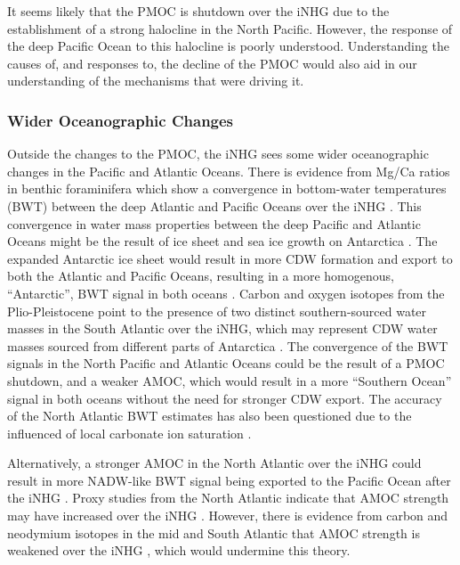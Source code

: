 It seems likely that the PMOC is shutdown over the iNHG due to the establishment of a strong halocline in the North Pacific. However, the response of the deep Pacific Ocean to this halocline is poorly understood. Understanding the causes of, and responses to, the decline of the PMOC would also aid in our understanding of the mechanisms that were driving it.

\subsubsection{Wider Oceanographic Changes}

Outside the changes to the PMOC, the iNHG sees some wider oceanographic changes in the Pacific and Atlantic Oceans. There is evidence from Mg/Ca ratios in benthic foraminifera which show a convergence in bottom-water temperatures (BWT) between the deep Atlantic and Pacific Oceans over the iNHG \citep{woodardAntarcticRoleNorthern2014}. This convergence in water mass properties between the deep Pacific and Atlantic Oceans might be the result of ice sheet and sea ice growth on Antarctica \citep{woodardAntarcticRoleNorthern2014}. The expanded Antarctic ice sheet would result in more CDW formation and export to both the Atlantic and Pacific Oceans, resulting in a more homogenous, ``Antarctic'', BWT signal in both oceans \citep{hillModelledOceanChanges2017}. Carbon and oxygen isotopes from the Plio-Pleistocene point to the presence of two distinct southern-sourced water masses in the South Atlantic over the iNHG, which may represent CDW water masses sourced from different parts of Antarctica \citep{vanderweijstTernaryMixingModel2020}. The convergence of the BWT signals in the North Pacific and Atlantic Oceans could be the result of a PMOC shutdown, and a weaker AMOC, which would result in a more “Southern Ocean” signal in both oceans without the need for stronger CDW export. The accuracy of the North Atlantic BWT estimates has also been questioned due to the influenced of local carbonate ion saturation \citep{yuCommentDeepSeaTemperature2010,sosdianResponseCommentDeepSea2010,sosdianDeepSeaTemperatureIce2009}.

Alternatively, a stronger AMOC in the North Atlantic over the iNHG could result in more NADW-like BWT signal being exported to the Pacific Ocean after the iNHG \citep{kwiekPacificOceanIntermediate1999}. Proxy studies from the North Atlantic indicate that AMOC strength may have increased over the iNHG \citep{hayashiLatestPlioceneNorthern2020}. However, there is evidence from carbon and neodymium isotopes in the mid and South Atlantic that AMOC strength is weakened over the iNHG \citep{hodellHighResolutionStableIsotopic1992, langIncursionsSouthernsourcedWater2016}, which would undermine this theory. 

